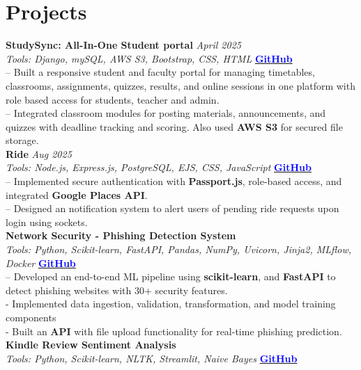 \documentclass[a4paper,11pt]{article}
\begin{document}
\vspace{-20pt}
\section*{Projects}


\textbf{ StudySync: All-In-One Student portal} \hfill \textit{April 2025} \\
\textit{Tools: Django, mySQL, AWS S3, Bootstrap, CSS, HTML} \hfill 
\href{https://github.com/Mithi-2005/StudySync}{\textcolor{blue}{\textbf{GitHub}}} \\
– Built a responsive student and faculty portal for managing timetables, classrooms, assignments, quizzes, results, and online sessions in one platform with role based access for students, teacher and admin. \\
– Integrated classroom modules for posting materials, announcements, and quizzes with deadline tracking and scoring. Also used \textbf{AWS S3} for secured file storage.\\[6 pt]
\textbf{Ride} \hfill \textit{Aug 2025} \\
\textit{Tools: Node.js, Express.js, PostgreSQL, EJS, CSS, JavaScript} \hfill 
\href{https://github.com/Mithi-2005/ride}{\textcolor{blue}{\textbf{GitHub}}} \\
– Implemented secure authentication with \textbf{Passport.js}, role-based access, and integrated \textbf{Google Places API}. \\
– Designed an notification system to alert users of pending ride requests upon login using sockets. \\[6 pt]
\textbf{Network Security - Phishing Detection System}\\
\textit{Tools: Python, Scikit-learn, FastAPI, Pandas, NumPy, Uvicorn, Jinja2, MLflow, Docker}\hfill 
\href{https://github.com/Mithi-2005/network_security}{\textcolor{blue}{\textbf{GitHub}}}
 \\
– Developed an end-to-end ML pipeline using \textbf{scikit-learn}, and \textbf{FastAPI} to detect phishing websites with 30+ security features. \\
- Implemented data ingestion, validation, transformation, and model training components  \\
- Built an \textbf{API} with file upload functionality for real-time phishing prediction. \\[6 pt]
\textbf{Kindle Review Sentiment Analysis} \\
\textit{Tools: Python, Scikit-learn, NLTK, Streamlit, Naive Bayes}\hfill 
\href{https://github.com/Mithi-2005/sentiment_analysis}{\textcolor{blue}{\textbf{GitHub}}} \\
\end{document}
